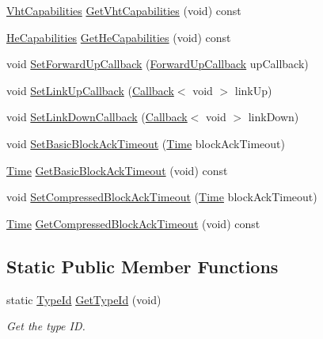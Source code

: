 \begin{DoxyCompactItemize}
\item 
\hyperlink{classns3_1_1VhtCapabilities}{Vht\+Capabilities} \hyperlink{classns3_1_1RegularWifiMac_ade487870f5663694d30a2dd6a7e614e8}{Get\+Vht\+Capabilities} (void) const 
\item 
\hyperlink{classns3_1_1HeCapabilities}{He\+Capabilities} \hyperlink{classns3_1_1RegularWifiMac_aea22761a20fdff9f6c1a9acc49d63700}{Get\+He\+Capabilities} (void) const 
\item 
void \hyperlink{classns3_1_1RegularWifiMac_ad987028160536423d19c007475621e19}{Set\+Forward\+Up\+Callback} (\hyperlink{classns3_1_1RegularWifiMac_a7f9bf4f4f1fc2514fcbf651015929225}{Forward\+Up\+Callback} up\+Callback)
\item 
void \hyperlink{classns3_1_1RegularWifiMac_a093dd2e9fcca0c14998b2f551fa0e4e8}{Set\+Link\+Up\+Callback} (\hyperlink{classns3_1_1Callback}{Callback}$<$ void $>$ link\+Up)
\item 
void \hyperlink{classns3_1_1RegularWifiMac_abdeebd57bb2e06e9756ff8b7310973bf}{Set\+Link\+Down\+Callback} (\hyperlink{classns3_1_1Callback}{Callback}$<$ void $>$ link\+Down)
\item 
void \hyperlink{classns3_1_1RegularWifiMac_a64b2dd2ab3962d6950b5462a76f8b382}{Set\+Basic\+Block\+Ack\+Timeout} (\hyperlink{classns3_1_1Time}{Time} block\+Ack\+Timeout)
\item 
\hyperlink{classns3_1_1Time}{Time} \hyperlink{classns3_1_1RegularWifiMac_ae31bb9d2922aa8569243fc5e287d1eb3}{Get\+Basic\+Block\+Ack\+Timeout} (void) const 
\item 
void \hyperlink{classns3_1_1RegularWifiMac_aeb94de0e2201e73f4ab12ce898f3f787}{Set\+Compressed\+Block\+Ack\+Timeout} (\hyperlink{classns3_1_1Time}{Time} block\+Ack\+Timeout)
\item 
\hyperlink{classns3_1_1Time}{Time} \hyperlink{classns3_1_1RegularWifiMac_ae553d416f86f48741d8d6e799aab6ab6}{Get\+Compressed\+Block\+Ack\+Timeout} (void) const 
\end{DoxyCompactItemize}
\subsection*{Static Public Member Functions}
\begin{DoxyCompactItemize}
\item 
static \hyperlink{classns3_1_1TypeId}{Type\+Id} \hyperlink{classns3_1_1RegularWifiMac_a8f882e251de837e5cc2022b25604dc01}{Get\+Type\+Id} (void)
\begin{DoxyCompactList}\small\item\em Get the type ID. \end{DoxyCompactList}\end{DoxyCompactItemize}

